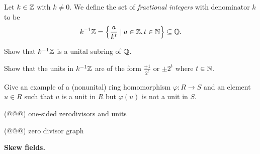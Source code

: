 \begin{dfn} \label{dfn:fractional-integers}
Let \(k \in \mathbb{Z}\) with \(k \neq 0\).
We define the set of \emph{fractional integers} with denominator \(k\) to be \[ {k}^{-1}\mathbb{Z} = \left\{ \frac{a}{k^t} \mid a \in \mathbb{Z}, t \in \mathbb{N} \right\} \subseteq \mathbb{Q}. \]
\end{dfn}

\begin{exercise}
Show that \({k}^{-1}\mathbb{Z}\) is a unital subring of \(\mathbb{Q}\).
\end{exercise}

\begin{exercise}
Show that the units in \({k}^{-1}\mathbb{Z}\) are of the form \(\frac{\pm 1}{2^t}\) or \(\pm 2^t\) where \(t \in \mathbb{N}\).
\end{exercise}

\begin{exercise}
Give an example of a (nonunital) ring homomorphism \(\varphi : R \rightarrow S\) and an element \(u \in R\) such that \(u\) is a unit in \(R\) but \(\varphi(u)\) is not a unit in \(S\).
\end{exercise}

(@@@) one-sided zerodivisors and units

(@@@) zero divisor graph

\textbf{Skew fields.}
